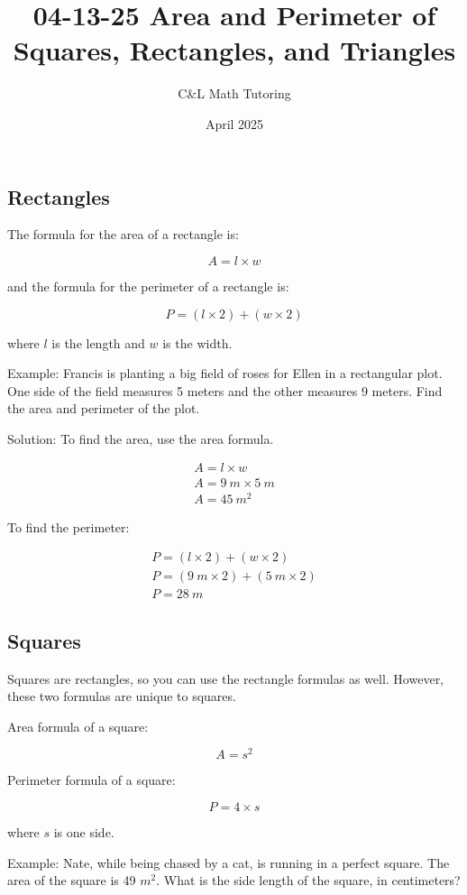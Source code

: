 \documentclass[a4paper, 12pt]{article}
\title{04-13-25 Area and Perimeter of Squares, Rectangles, and Triangles}
\author{C\&L Math Tutoring}
\date{April 2025}
\begin{document}
\maketitle

\subsection*{Rectangles}
The formula for the area of a rectangle is:

$$A = l \times w $$

and the formula for the perimeter of a rectangle is:

$$P = (l \times 2) + (w \times 2)$$

where $l$ is the length and $w$ is the width.

Example: Francis is planting a big field of roses for Ellen in a rectangular plot. One side of the field measures 5 meters and the other measures 9 meters. Find the area and perimeter of the plot.

Solution: To find the area, use the area formula.

\begin{gather*}
A = l \times w \\
A = 9 \: m \times 5 \:  m \\
A = \boxed{45 \: m^2}
\end{gather*}

To find the perimeter:

\begin{gather*}
P = (l \times 2) + (w \times 2) \\
P = (9 \: m \times 2) + (5 \: m \times 2) \\
P = \boxed{28 \: m}
\end{gather*}

\subsection*{Squares}
Squares are rectangles, so you can use the rectangle formulas as well. However, these two formulas are unique to squares.

Area formula of a square:

$$A = s^2$$

Perimeter formula of a square:

$$P = 4 \times s$$

where $s$ is one side.

Example: Nate, while being chased by a cat, is running in a perfect square. The area of the square is 49 $m^2$. What is the side length of the square, in centimeters?
\end{document}
